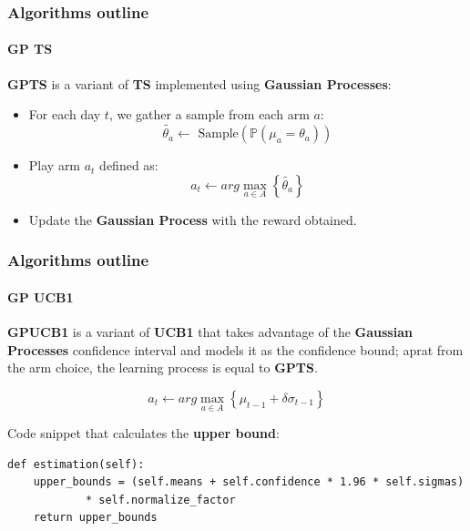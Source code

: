 \begin{frame}

\frametitle{Algorithms outline}
\framesubtitle{GP TS}

\textbf{GPTS} is a variant of \textbf{TS} implemented using \textbf{Gaussian Processes}:

\begin{itemize}[label={$\circ$}]
	\item For each day $t$, we gather a sample from each arm $a$:
		\begin{displaymath}
			\tilde{\theta_a} \leftarrow \text{ Sample} \left( \mathbb{P}(\mu_a = \theta_a) \right)
		\end{displaymath}
	\item Play arm $a_t$ defined as:
		\begin{displaymath}
			a_t \leftarrow arg\max_{a \in A} \left\{ \tilde{\theta_a} \right\}
		\end{displaymath}
	\item Update the \textbf{Gaussian Process} with the reward obtained.
\end{itemize}

\end{frame}


\begin{frame}[fragile]

\frametitle{Algorithms outline}
\framesubtitle{GP UCB1}

\textbf{GPUCB1} is a variant of \textbf{UCB1} that takes advantage of the \textbf{Gaussian Processes} confidence interval and models it as the confidence bound; aprat from the arm choice, the learning process is equal to \textbf{GPTS}.

\begin{displaymath}
	a_t \leftarrow arg\max_{a \in A} \left\{ \mu_{t-1} + \delta \sigma_{t-1} \right\}
\end{displaymath}

Code snippet that calculates the \textbf{upper bound}:

\begin{lstlisting}[style=Python, basicstyle=\tiny, numbers=none, xrightmargin=15px]
def estimation(self):
	upper_bounds = (self.means + self.confidence * 1.96 * self.sigmas)
			* self.normalize_factor
	return upper_bounds
\end{lstlisting}

\end{frame}

